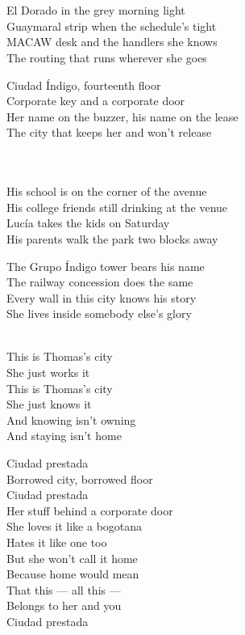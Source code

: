 \begin{lyrics}


\\
\\
El Dorado in the grey morning light\\
Guaymaral strip when the schedule's tight\\
MACAW desk and the handlers she knows\\
The routing that runs wherever she goes

Ciudad Índigo, fourteenth floor\\
Corporate key and a corporate door\\
Her name on the buzzer, his name on the lease\\
The city that keeps her and won't release

\\
\\
His school is on the corner of the avenue\\
His college friends still drinking at the venue\\
Lucía takes the kids on Saturday\\
His parents walk the park two blocks away

The Grupo Índigo tower bears his name\\
The railway concession does the same\\
Every wall in this city knows his story\\
She lives inside somebody else's glory

\\
This is Thomas's city\\
She just works it\\
This is Thomas's city\\
She just knows it\\
And knowing isn't owning\\
And staying isn't home

Ciudad prestada\\
Borrowed city, borrowed floor\\
Ciudad prestada\\
Her stuff behind a corporate door\\
She loves it like a bogotana\\
Hates it like one too\\
But she won't call it home\\
Because home would mean\\
That this — all this —\\
Belongs to her and you\\
Ciudad prestada


\end{lyrics}
